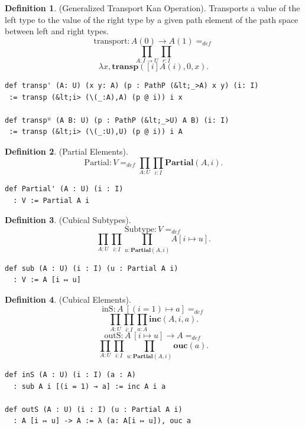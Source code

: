 \documentclass{article}
\theoremstyle{definition}
\newtheorem{definition}{Definition}
\begin{document}
\newpage

\begin{definition} (Generalized Transport Kan Operation).
Transports a value of the left type to the value of the right type
by a given path element of the path space between left and right types.
$$
  \mathrm{transport} : A(0) \rightarrow A(1) =_{def}
$$
$$
  \prod_{A:I\rightarrow U}\prod_{r:I}
$$
$$
  \lambda x,\mathbf{transp}([i]A(i),0,x).
$$
\begin{lstlisting}[mathescape=true]
def transp' (A: U) (x y: A) (p : PathP (&lt;_>A) x y) (i: I)
 := transp (&lt;i> (\(_:A),A) (p @ i)) i x

def transpᵁ (A B: U) (p : PathP (&lt;_>U) A B) (i: I)
 := transp (&lt;i> (\(_:U),U) (p @ i)) i A
\end{lstlisting}
\end{definition}

\begin{definition} (Partial Elements).
$$
  \mathrm{Partial} : V =_{def} \prod_{A:U}\prod_{i:I}\mathbf{Partial}(A,i).
$$
\begin{lstlisting}[mathescape=true]
def Partial' (A : U) (i : I)
  : V := Partial A i
\end{lstlisting}
\end{definition}

\begin{definition} (Cubical Subtypes).
$$
  \mathrm{Subtype} : V =_{def}
$$
$$
  \prod_{A:U}\prod_{i:I}\prod_{u:\mathbf{Partial}(A,i)}A[i \mapsto u].
$$
\begin{lstlisting}[mathescape=true]
def sub (A : U) (i : I) (u : Partial A i)
  : V := A [i ↦ u]
\end{lstlisting}
\end{definition}

\begin{definition} (Cubical Elements).
$$
  \mathrm{inS} :  A\ [(i=1) \mapsto a ] =_{def}
$$
$$
  \prod_{A:U}\prod_{i:I}\prod_{a:A}\mathbf{inc}(A,i,a).
$$
$$
  \mathrm{outS} : A\ [i \mapsto u] \rightarrow A =_{def}
$$
$$
  \prod_{A:U}\prod_{i:I}\prod_{u:\mathbf{Partial}(A,i)}
  \mathbf{ouc}(a).
$$
\begin{lstlisting}[mathescape=true]
def inS (A : U) (i : I) (a : A)
  : sub A i [(i = 1) → a] := inc A i a

def outS (A : U) (i : I) (u : Partial A i)
  : A [i ↦ u] -> A := λ (a: A[i ↦ u]), ouc a
\end{lstlisting}
\end{definition}
\end{document}

